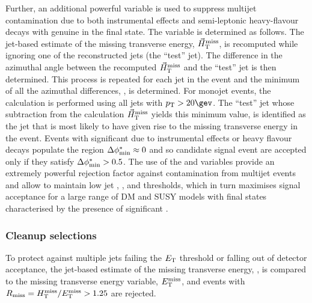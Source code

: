 \subsubsection*{\bdphi}

Further, an additional powerful variable \bdphi is used to suppress multijet contamination due to both instrumental effects and semi-leptonic heavy-flavour decays with genuine \met in the final state. The variable is determined as follows. The jet-based estimate of the missing transverse energy, ${\mbox{$\vec{H}_{\rm T}^{\rm miss}$}}$, is recomputed while ignoring one of the reconstructed jets (the ``test'' jet). The
difference in the azimuthal angle between the recomputed $\mbox{$\vec{H}_{\rm T}^{\rm miss}$}$ and the ``test'' jet is then determined. This process is repeated for each jet in the event and the minimum of all the azimuthal differences, \bdphi, is determined. For monojet events, the calculation is 
performed using all jets with $\Pt > 20\gev$. The ``test'' jet whose subtraction from the calculation $\mbox{$\vec{H}_{\rm T}^{\rm miss}$}$ yields this minimum value, is
identified as the jet that is most likely to have given rise to the missing transverse energy in the event. Events with significant \mht
due to instrumental effects or heavy flavour decays populate the region $\mbox{$\Delta\phi^{*}_{\rm min}$} \approx 0$ and so candidate signal event are accepted
only if they satisfy $\mbox{$\Delta\phi^{*}_{\rm min}$} > 0.5$. The use of the \bdphi and \alphat variables provide an extremely powerful rejection factor against
contamination from multijet events and allow to maintain low jet \PT, \HT, and \mht thresholds, which in turn maximises signal acceptance
for a large range of DM and SUSY models with final states characterised by the presence of significant \met.


\subsubsection*{Cleanup selections}
To protect against multiple jets failing the ${E_{\text T}}$ threshold or falling out of detector acceptance, the jet-based estimate of the missing transverse energy, \mht, is compared to the missing transverse energy variable, $\mbox{$E_\text{T}^{\rm miss}$}$, and events with $R_{\rm
  miss}=\mbox{$H_{\rm T}^{\rm miss}$}/\mbox{$E_\text{T}^{\rm miss}$} > 1.25$ are rejected. 
  
